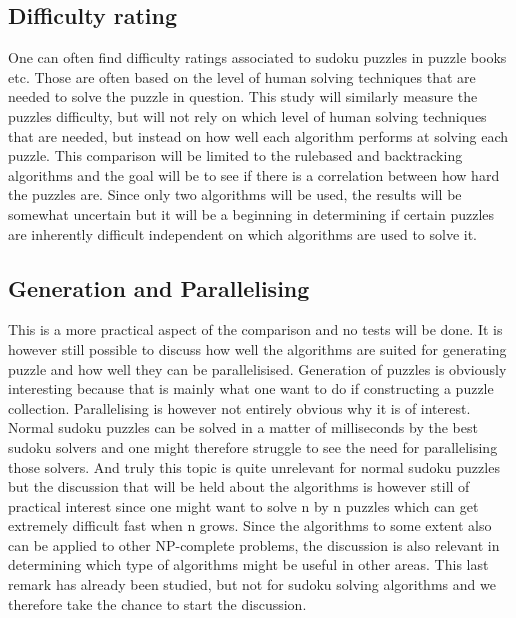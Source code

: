 \documentclass[a4paper,11pt]{kth-mag}
\begin{document}
\subsection{Difficulty rating}
One can often find difficulty ratings associated to sudoku puzzles in puzzle books etc. Those are often based on the level of human solving techniques that are needed to solve the puzzle in question. \cite{difficulty} 
This study will similarly measure the puzzles difficulty, but will not rely on which level of human solving techniques that are needed, but instead on how well each algorithm performs at solving each puzzle. 
This comparison will be limited to the rulebased and backtracking algorithms and the goal will be to see if there is a correlation between how hard the puzzles are. 
Since only two algorithms will be used, the results will be somewhat uncertain but it will be a beginning in determining if certain puzzles are inherently difficult independent on which algorithms are used to solve it.

\subsection{Generation and Parallelising}
This is a more practical aspect of the comparison and no tests will be done. It is however still possible to discuss how well the algorithms are suited for generating puzzle and how well they can be parallelisised. Generation of puzzles is obviously interesting because that is mainly what one want to do if constructing a puzzle collection. Parallelising is however not entirely obvious why it is of interest. Normal sudoku puzzles can be solved in a matter of milliseconds by the best sudoku solvers and one might therefore struggle to see the need for parallelising those solvers. And truly this topic is quite unrelevant for normal sudoku puzzles but the discussion that will be held about the algorithms is however still of practical interest since one might want to solve n by n puzzles which can get extremely difficult fast when n grows. Since the algorithms to some extent also can be applied to other NP-complete problems, the discussion is also relevant in determining which type of algorithms might be useful in other areas. This last remark has already been studied, but not for sudoku solving algorithms and we therefore take the chance to start the discussion.
\end{document}
